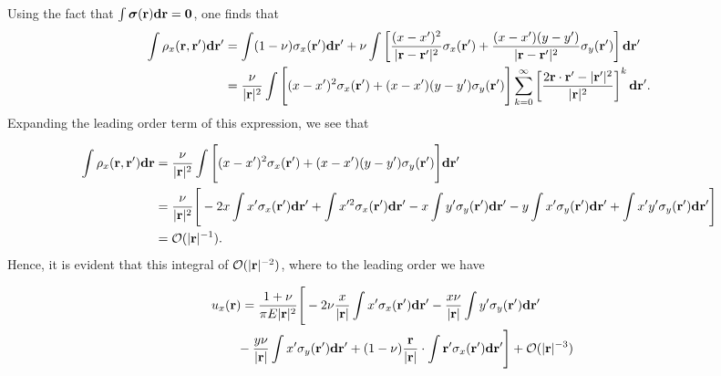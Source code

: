 \documentclass[aps,prl,reprint,twocolumn,groupedaddress,showpacs]{revtex4-1}
\newcommand{\bsigma}{{\boldsymbol\sigma}}
\def\d{{\bf d}}
\def\r{{\bf r}}
\begin{document}
\begin{widetext}
Using the fact that $\int \bsigma(\r)\d\r = \mathbf{0}$, one finds that
%
\begin{align}
\int \rho_{x}(\r,\r')\d\r'  & =  \int (1-\nu)\sigma_x(\r')\d\r'
+\nu\int\left[\frac{(x - x')^2}{|\r-\r'|^2} \sigma_{x}(\r') +
\frac{(x-x')(y-y')}{|\r-\r'|^2} \sigma_y(\r')  \right]\d\r' \nonumber\\
\: &= \frac{\nu}{|\r|^2}\int\Bigg[(x - x')^2\sigma_{x}(\r')
+ (x-x')(y-y')\sigma_y(\r')  \Bigg]
\sum_{k=0}^\infty \left[\frac{2\r\cdot\r' - |\r'|^2}{|\r|^2} \right]^k \d\r'.
\end{align}
%
Expanding the leading order term of this expression, we see that

\begin{align*}
\int\rho_{x}(\r,\r')\d\r 
&= \frac{\nu}{|\r|^2}\int\Bigg[(x- x')^2\sigma_{x}(\r')+(x-x')(y-y')\sigma_y(\r')\Bigg]
\d\r' \nonumber\\
\: &= \frac{\nu}{|\r|^2}  \Bigg[  -2x\int x'\sigma_x(\r')\d\r'  + \int x'^2\sigma_x(\r')\d\r'- x\int y' \sigma_y(\r') \d\r'- y\int x'\sigma_y(\r')\d\r'
+ \int x'y' \sigma_y(\r') \d\r'\Bigg] \nonumber \\
\: & =\mathcal{O}(|\r|^{-1}).
\end{align*}
%
Hence, it is evident that this integral of $\mathcal{O}(|\r|^{-2})$,
where to the leading order we have

\begin{align}
\lefteqn{u_x(\r) = \frac{1+\nu}{\pi E |\r|^2}
\Bigg[ -2\nu\frac{x}{|\r|}\int x'\sigma_x(\r')\d\r'
-\frac{x\nu}{|\r|}\int y' \sigma_y(\r') \d\r'  }\nonumber\\
&\qquad- \frac{y\nu}{|\r|}\int x'\sigma_y(\r')\d\r' 
+ (1-\nu)\frac{\r}{|\r|}\cdot\int \r'\sigma_x(\r') \d\r'\Bigg] + \mathcal{O}(|\r|^{-3})
\end{align}



\end{widetext}
\end{document}
